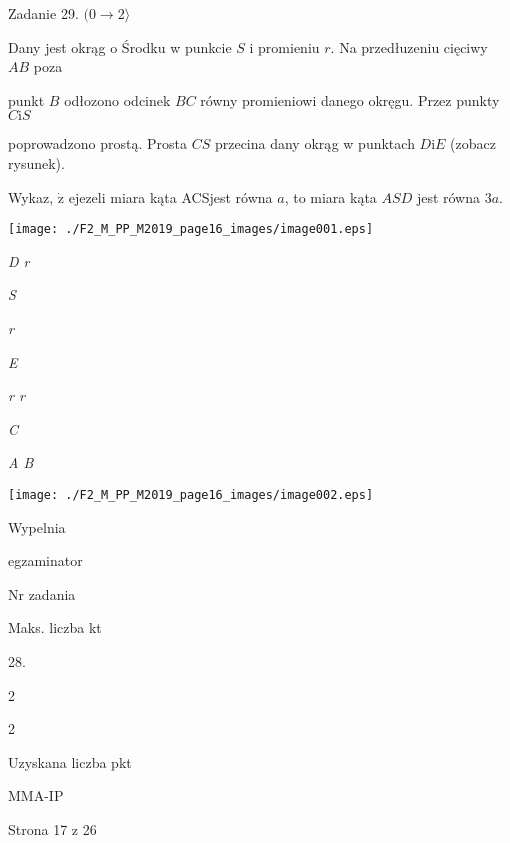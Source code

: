 \documentclass[a4paper,12pt]{article}
\begin{document}
Zadanie 29. $(0\rightarrow 2\rangle$

Dany jest okrąg o Środku w punkcie $S$ i promieniu $r$. Na przedłuzeniu cięciwy $AB$ poza

punkt $B$ odłozono odcinek $BC$ równy promieniowi danego okręgu. Przez punkty $C \mathrm{i} S$

poprowadzono prostą. Prosta $CS$ przecina dany okrąg w punktach $D\mathrm{i}E$ (zobacz rysunek).

Wykaz, $\dot{\mathrm{z}}$ ejezeli miara kąta ACSjest równa $a$, to miara kąta $ASD$ jest równa $3a.$
\begin{center}
\texttt{[image: ./F2\_M\_PP\_M2019\_page16\_images/image001.eps]}
\end{center}
{\it D  r}

{\it S}

{\it r}

{\it E}

{\it r  r}

{\it C}

{\it A  B}
\begin{center}
\texttt{[image: ./F2\_M\_PP\_M2019\_page16\_images/image002.eps]}
\end{center}
Wypelnia

egzaminator

Nr zadania

Maks. liczba kt

28.

2

2

Uzyskana liczba pkt

MMA-IP

Strona 17 z 26
\end{document}

